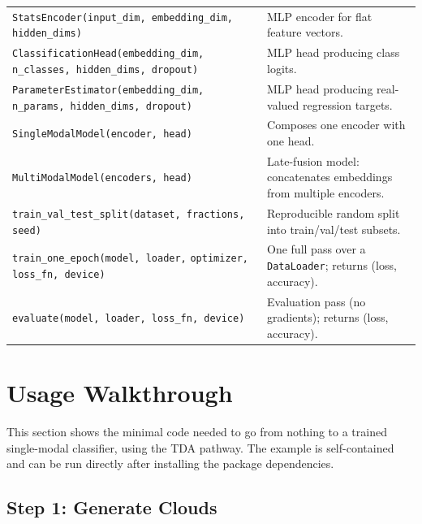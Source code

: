\documentclass[11pt, a4paper]{article}
\newcommand{\code}[1]{\texttt{#1}}
\begin{document}
\begin{longtable}{p{5.6cm} p{9.5cm}}
\code{StatsEncoder(input\_dim, embedding\_dim,} \code{hidden\_dims)} &
  MLP encoder for flat feature vectors. \\[4pt]

\code{ClassificationHead(embedding\_dim,} \code{n\_classes, hidden\_dims, dropout)} &
  MLP head producing class logits. \\[4pt]

\code{ParameterEstimator(embedding\_dim,} \code{n\_params, hidden\_dims, dropout)} &
  MLP head producing real-valued regression targets. \\[4pt]

\code{SingleModalModel(encoder, head)} &
  Composes one encoder with one head. \\[4pt]

\code{MultiModalModel(encoders, head)} &
  Late-fusion model: concatenates embeddings from multiple encoders. \\[4pt]

\code{train\_val\_test\_split(dataset, fractions, seed)} &
  Reproducible random split into train/val/test subsets. \\[4pt]

\code{train\_one\_epoch(model, loader,} \code{optimizer, loss\_fn, device)} &
  One full pass over a \code{DataLoader}; returns (loss, accuracy). \\[4pt]

\code{evaluate(model, loader, loss\_fn, device)} &
  Evaluation pass (no gradients); returns (loss, accuracy). \\[4pt]

\end{longtable}

\section{Usage Walkthrough}
\label{sec:walkthrough}

This section shows the minimal code needed to go from nothing to a
trained single-modal classifier, using the TDA pathway.
The example is self-contained and can be run directly after installing
the package dependencies.

\subsection{Step 1: Generate Clouds}
\end{document}
